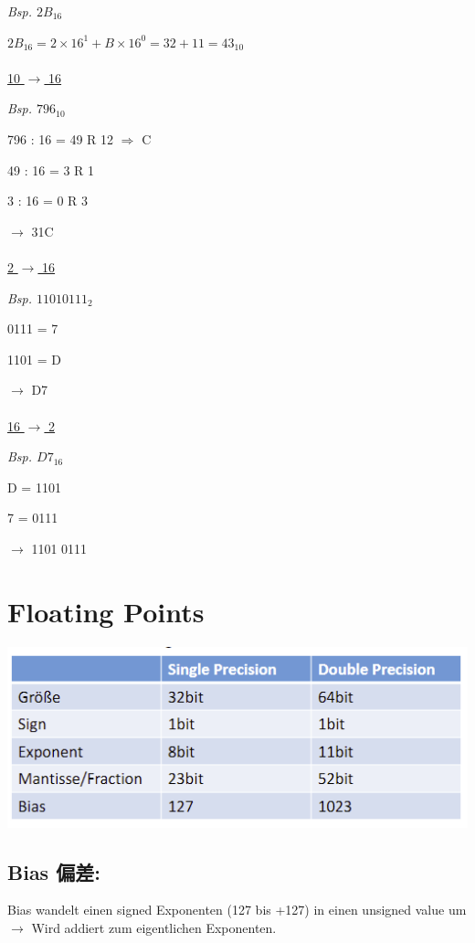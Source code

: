 \documentclass[fleqn]{article}
\begin{document}
\noindent\textit{Bsp. $2B_{16}$}

$2B_{16} = 2\times 16^1 + B\times 16^0 = 32 + 11 = 43_{10}$
\\
\\
\noindent\underline{10 $\rightarrow$ 16}

\noindent\textit{Bsp. $796_{10}$}

796 : 16 = 49 R 12 $\Rightarrow$ C

49 : 16 = 3 R 1

3 : 16 = 0 R 3

$\rightarrow$ 31C
\\
\\
\noindent\underline{2 $\rightarrow$ 16}

\noindent\textit{Bsp. $1101 0111_{2}$}

0111 = 7

1101 = D

$\rightarrow$ D7
\\
\\
\noindent\underline{16 $\rightarrow$ 2}

\noindent\textit{Bsp. $D7_{16}$}

D = 1101

7 = 0111

$\rightarrow$ 1101 0111

\section{Floating Points}

\begin{center}
    \includegraphics[scale=0.6]{18.png}
\end{center}

\subsection{Bias 偏差:} 

Bias wandelt einen signed Exponenten (127 bis +127) in einen unsigned value um $\rightarrow$ Wird addiert zum eigentlichen Exponenten.
\end{document}
